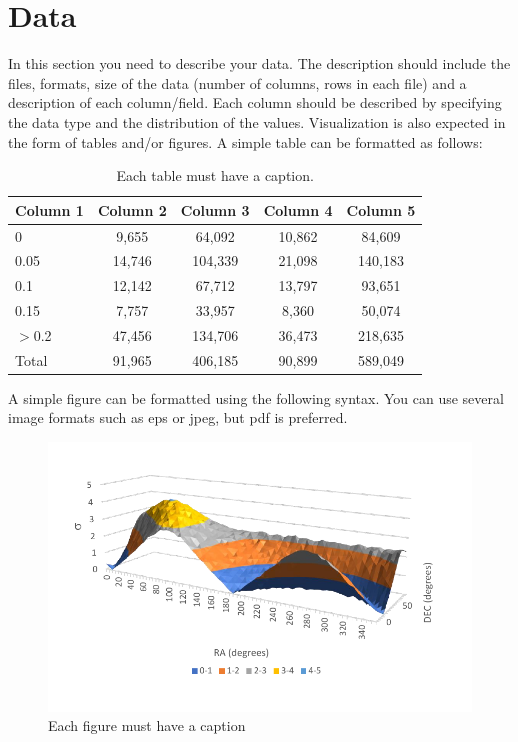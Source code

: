 \documentclass[article,pdftex,10pt,a4paper,twocolumn]{article}
\begin{document}
\section{Data}
\label{data}

In this section you need to describe your data. The description should include the files, formats, size of the data (number of columns, rows in each file) and a description of each column/field. Each column should be described by specifying the data type and the distribution of the values. Visualization is also expected in the form of tables and/or figures. A simple table can be formatted as follows:



\begin{table}[h]
{
\scriptsize
\begin{tabular}{|l|c|c|c|c|}
\hline
Column 1 &  Column 2    &  Column 3  & Column 4 & Column 5 \\      
\hline
0   &    9,655   &   64,092  &  10,862     &    84,609    \\
0.05 &   14,746  &  104,339   & 21,098   &   140,183    \\
0.1 &    12,142  &  67,712  &  13,797   &    93,651    \\   
0.15  &  7,757    & 33,957  &  8,360     &     50,074    \\
$>$0.2  &  47,456    & 134,706    & 36,473    &   218,635    \\
\hline
Total      &  91,965 &  406,185  & 90,899   & 589,049  \\
\hline        
\end{tabular}
\caption{Each table must have a caption.}
\label{table_label}

}
\end{table}




A simple figure can be formatted using the following syntax. You can use several image formats such as eps or jpeg, but pdf is preferred.

\begin{figure}
\centering
\includegraphics[scale=1.0]{figure_file.pdf}
\caption{Each figure must have a caption}
\label{figure_label}
\end{figure}
\end{document}
